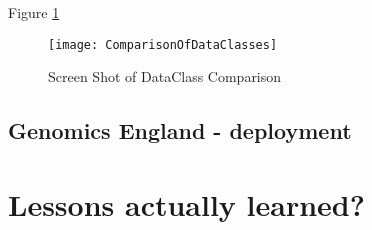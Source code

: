  Figure \ref{fig:dataClassComparison}
 \begin{figure}[here]
 	\texttt{[image: ComparisonOfDataClasses]}
 	\caption{Screen Shot of DataClass Comparison} 
 	\label{fig:dataClassComparison}	
 \end{figure}



\subsection{Genomics England -  deployment}


\section{Lessons actually learned?}


